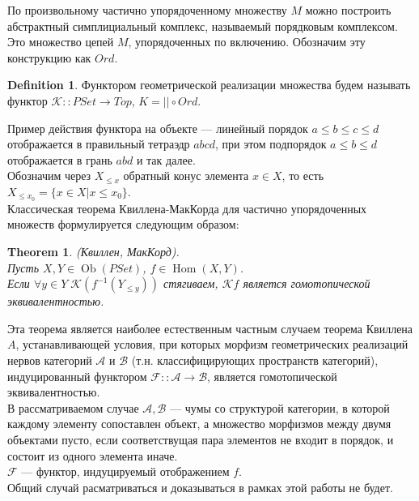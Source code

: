 \documentclass[a4paper, 12pt]{article}
\newtheorem{theorem}{Theorem}
\theoremstyle{definition}
\newtheorem{definition}{Definition}
\theoremstyle{remark}
\begin{document}
По произвольному частично упорядоченному множеству $M$ можно построить абстрактный симплициальный комплекс, называемый порядковым комплексом. Это множество цепей $M$, упорядоченных по включению. Обозначим эту конструкцию как $Ord$.

\begin{definition}
Функтором геометрической реализации множества будем называть функтор $\mathcal{K} :: PSet \to Top$, $K = || \circ Ord$.
\end{definition}

Пример действия функтора на объекте --- линейный порядок $a \leq b \leq c \leq d$ отображается в правильный тетраэдр $abcd$, при этом подпорядок $a \leq b \leq d$ отображается в грань $abd$ и так далее.\\
Обозначим через $X_{\leqslant x}$ обратный конус элемента $x \in X$, то есть $X_{\leqslant x_0} = \{x \in X | x \leqslant x_0\}$.\\

Классическая теорема Квиллена-МакКорда для частично упорядоченных множеств формулируется следующим образом:\\
\begin{theorem}
  \textit{(Квиллен, МакКорд)}.\\
  Пусть $X, Y \in \operatorname{Ob}(PSet)$, $f \in \operatorname{Hom}(X,Y)$.\\
  Если $\forall y \in Y\;\mathcal{K}(f^{-1}(Y_{\leqslant y}))$ стягиваем, $\mathcal{K}f$ является гомотопической эквивалентностью.\\
\end{theorem}

\begin{itshape}
Эта теорема является наиболее естественным частным случаем теорема Квиллена $A$, устанавливающей условия, при которых морфизм геометрических реализаций нервов категорий $\mathcal{A}$ и $\mathcal{B}$ (т.н. классифицирующих пространств категорий), индуцированный функтором $\mathcal{F} :: \mathcal{A} \to \mathcal{B}$, является гомотопической эквивалентностью.\\

В рассматриваемом случае $\mathcal{A}, \mathcal{B}$ --- чумы со структурой категории, в которой каждому элементу сопоставлен объект, а множество морфизмов между двумя объектами пусто, если соответствущая пара элементов не входит в порядок, и состоит из одного элемента иначе.\\
$\mathcal{F}$ --- функтор, индуцируемый отображением $f$.\\
Общий случай расматриваться и доказываться в рамках этой работы не будет.
\end{itshape}
\end{document}
